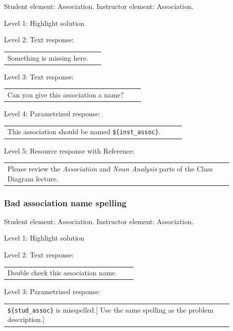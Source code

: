 Student element: Association. Instructor element: Association. \medskip

\noindent Level 1: Highlight solution  \medskip

\noindent Level 2: Text response: \medskip

\begin{tabular}{|p{0.9\linewidth}}
Something is missing here.
\end{tabular} \medskip

\noindent Level 3: Text response: \medskip

\begin{tabular}{|p{0.9\linewidth}}
Can you give this association a name?
\end{tabular} \medskip

\noindent Level 4: Parametrized response: \medskip

\begin{tabular}{|p{0.9\linewidth}}
This association should be named \verb|${inst_assoc}|.
\end{tabular} \medskip

\noindent Level 5: Resource response with Reference: \medskip

\begin{tabular}{|p{0.9\linewidth}}
Please review the \textit{Association} and \textit{Noun Analysis} parts of the Class Diagram lecture.
\end{tabular} \medskip


\subsubsection{Bad association name spelling}

Student element: Association. Instructor element: Association. \medskip

\noindent Level 1: Highlight solution  \medskip

\noindent Level 2: Text response: \medskip

\begin{tabular}{|p{0.9\linewidth}}
Double check this association name.
\end{tabular} \medskip

\noindent Level 3: Parametrized response: \medskip

\begin{tabular}{|p{0.9\linewidth}}
\verb|${stud_assoc}| is misspelled.[ Use the same spelling as the problem description.]
\end{tabular} \medskip


